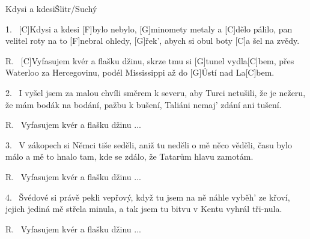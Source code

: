 \begin{song}{Kdysi a kdesi}{Šlitr/Suchý}

\begin{xverse}{1.~}
[C]Kdysi a kdesi [F]bylo nebylo,
[G]minomety metaly a [C]dělo pálilo,
pan velitel roty na to [F]nebral ohledy,
[G]{řek'}, abych si obul boty [C]{a šel} na zvědy.
\end{xverse}


\begin{xverse}{R.~}
[C]Vyfasujem kvér a flašku džinu,
skrze tmu si [G]tunel vydla[C]bem,
přes Waterloo za Hercegovinu,
podél Mississippi až do [G]{Ústí} nad La[C]bem.
\end{xverse}


\begin{xverse}{2.~}
I vyšel jsem za malou chvíli směrem k severu,
aby Turci netušili, že je nežeru,
že mám bodák na bodání, pažbu k bušení,
Taliáni nemaj' zdání ani tušení.
\end{xverse}


\begin{xverse}{R.~}
Vyfasujem kvér a flašku džinu ...
\end{xverse}


\begin{xverse}{3.~}
V zákopech si Němci tiše seděli,
aniž tu neděli o mě něco věděli,
času bylo málo a mě to hnalo tam,
kde se zdálo, že Tatarům hlavu zamotám.
\end{xverse}


\begin{xverse}{R.~}
Vyfasujem kvér a flašku džinu ...
\end{xverse}

\begin{xverse}{4.~}
Švédové si právě pekli vepřový,
když tu jsem na ně náhle vyběh' ze křoví,
jejich jediná mě střela minula,
a tak jsem tu bitvu v Kentu vyhrál tři-nula.
\end{xverse}


\begin{xverse}{R.~}
Vyfasujem kvér a flašku džinu ...
\end{xverse}

\end{song}

